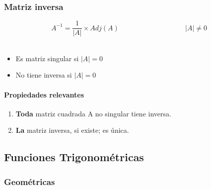 \documentclass[stu, 12pt, letterpaper, donotrepeattitle, floatsintext, natbib]{apa7}
\begin{document}
    \subsubsection{Matriz inversa}
    \[A^{-1}=\frac{1}{|A|} \times {Adj}(A) \hspace{4cm} |A|\neq 0 \]\\[0.5cm]
    \begin{itemize}
        \item Es matriz singular si $|A|=0$
        \item No tiene inversa si $|A|=0$
    \end{itemize}

    \paragraph{Propiedades relevantes}
    \begin{enumerate}
        \item \textbf{Toda} matriz cuadrada A no singular tiene inversa.
        \item \textbf{La} matriz inversa, si existe; es única.
    \end{enumerate}

    \newpage

    \subsection{Funciones Trigonométricas}\label{subsec:funciones-trigonometricas}

    \subsubsection{Geométricas}
\end{document}
